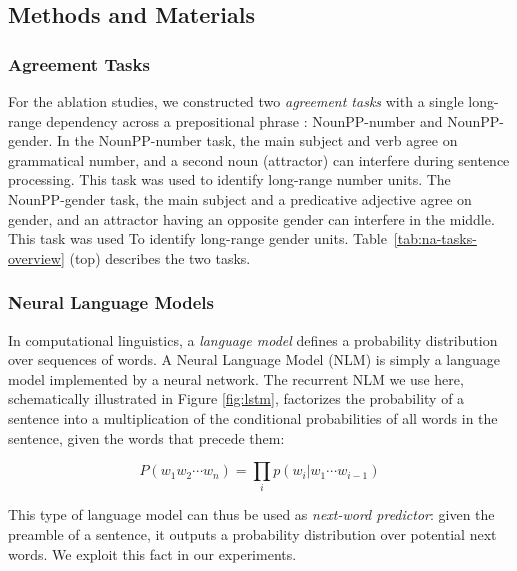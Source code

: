 \subsection{Methods and Materials}
\subsubsection{Agreement Tasks}
For the ablation studies, we constructed two \emph{agreement tasks} with a single long-range dependency across a prepositional phrase \citep{lakretz2019emergence}: NounPP-number and NounPP-gender. In the NounPP-number task, the main subject and verb agree on grammatical number, and a second noun (attractor) can interfere during sentence processing. This task was used to identify long-range number units. The NounPP-gender task, the main subject and a predicative adjective agree on gender, and an attractor having an opposite gender can interfere in the middle. This task was used To identify long-range gender units. Table~\ref{tab:na-tasks-overview} (top) describes the two tasks.



\subsubsection{Neural Language Models}
In computational linguistics, a \emph{language model} defines a probability distribution over sequences of words. A Neural Language Model (NLM) is simply a language model implemented by a neural network. The recurrent NLM we use here, schematically illustrated in Figure \ref{fig:lstm}, factorizes the probability of a sentence into a multiplication of the conditional probabilities of all words in the sentence, given the words that precede them:

\begin{equation}
    P(w_1 w_2 \cdots w_n) = \prod_i p(w_i|w_1 \cdots w_{i-1})
\end{equation}

This type of language model can thus be used as \emph{next-word predictor}: given the preamble of a sentence, it outputs a probability distribution over potential next words.
We exploit this fact in our experiments.

